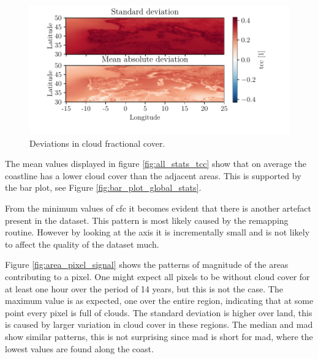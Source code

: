 \begin{figure}
    \centering
    \includegraphics{python_figs/DEVIATION_all_stat_variable_tcc.pdf}
    \caption{Deviations in  cloud fractional cover.}
    \label{fig:deviation_tcc}
\end{figure}

The mean values displayed in figure \ref{fig:all_stats_tcc} show that on average the coastline has a lower cloud cover than the adjacent areas. This is supported by the bar plot, see Figure \ref{fig:bar_plot_global_stats}. 

From the minimum values of \acrshort{cfc} it becomes evident that there is another artefact present in the dataset. This pattern is most likely caused by the remapping routine. However by looking at the axis it is incrementally small and is not likely to affect the quality of the dataset much.

Figure \ref{fig:area_pixel_signal} shows the patterns of magnitude of the areas contributing to a pixel. One might expect all pixels to be without cloud cover for at least one hour over the period of 14 years, but this is not the case. The maximum value is as expected, one over the entire region, indicating that at some point every pixel is full of clouds. The standard deviation is higher over land, this is caused by larger variation in cloud cover in these regions. The median and \acrshort{mad} 
show similar patterns, this is not surprising since \acrshort{mad} is short for \acrlong{mad}, where the lowest values are found along the coast.

